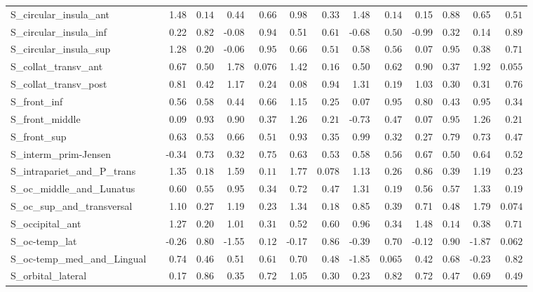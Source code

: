 {\begin{longtable}{llrrrrrrrrrrrr}
S\_circular\_insula\_ant &  & 1.48 & $0.14$ & 0.44 & $0.66$ & 0.98 & $0.33$ & 1.48 & $0.14$ & 0.15 & $0.88$ & 0.65 & $0.51$ \\
S\_circular\_insula\_inf &  & 0.22 & $0.82$ & -0.08 & $0.94$ & 0.51 & $0.61$ & -0.68 & $0.50$ & -0.99 & $0.32$ & 0.14 & $0.89$ \\
S\_circular\_insula\_sup &  & 1.28 & $0.20$ & -0.06 & $0.95$ & 0.66 & $0.51$ & 0.58 & $0.56$ & 0.07 & $0.95$ & 0.38 & $0.71$ \\
S\_collat\_transv\_ant &  & 0.67 & $0.50$ & 1.78 & $0.076$ & 1.42 & $0.16$ & 0.50 & $0.62$ & 0.90 & $0.37$ & 1.92 & $0.055$ \\
S\_collat\_transv\_post &  & 0.81 & $0.42$ & 1.17 & $0.24$ & 0.08 & $0.94$ & 1.31 & $0.19$ & 1.03 & $0.30$ & 0.31 & $0.76$ \\
S\_front\_inf &  & 0.56 & $0.58$ & 0.44 & $0.66$ & 1.15 & $0.25$ & 0.07 & $0.95$ & 0.80 & $0.43$ & 0.95 & $0.34$ \\
S\_front\_middle &  & 0.09 & $0.93$ & 0.90 & $0.37$ & 1.26 & $0.21$ & -0.73 & $0.47$ & 0.07 & $0.95$ & 1.26 & $0.21$ \\
S\_front\_sup &  & 0.63 & $0.53$ & 0.66 & $0.51$ & 0.93 & $0.35$ & 0.99 & $0.32$ & 0.27 & $0.79$ & 0.73 & $0.47$ \\
S\_interm\_prim-Jensen &  & -0.34 & $0.73$ & 0.32 & $0.75$ & 0.63 & $0.53$ & 0.58 & $0.56$ & 0.67 & $0.50$ & 0.64 & $0.52$ \\
S\_intrapariet\_and\_P\_trans &  & 1.35 & $0.18$ & 1.59 & $0.11$ & 1.77 & $0.078$ & 1.13 & $0.26$ & 0.86 & $0.39$ & 1.19 & $0.23$ \\
S\_oc\_middle\_and\_Lunatus &  & 0.60 & $0.55$ & 0.95 & $0.34$ & 0.72 & $0.47$ & 1.31 & $0.19$ & 0.56 & $0.57$ & 1.33 & $0.19$ \\
S\_oc\_sup\_and\_transversal &  & 1.10 & $0.27$ & 1.19 & $0.23$ & 1.34 & $0.18$ & 0.85 & $0.39$ & 0.71 & $0.48$ & 1.79 & $0.074$ \\
S\_occipital\_ant &  & 1.27 & $0.20$ & 1.01 & $0.31$ & 0.52 & $0.60$ & 0.96 & $0.34$ & 1.48 & $0.14$ & 0.38 & $0.71$ \\
S\_oc-temp\_lat &  & -0.26 & $0.80$ & -1.55 & $0.12$ & -0.17 & $0.86$ & -0.39 & $0.70$ & -0.12 & $0.90$ & -1.87 & $0.062$ \\
S\_oc-temp\_med\_and\_Lingual &  & 0.74 & $0.46$ & 0.51 & $0.61$ & 0.70 & $0.48$ & -1.85 & $0.065$ & 0.42 & $0.68$ & -0.23 & $0.82$ \\
S\_orbital\_lateral &  & 0.17 & $0.86$ & 0.35 & $0.72$ & 1.05 & $0.30$ & 0.23 & $0.82$ & 0.72 & $0.47$ & 0.69 & $0.49$ \\

\end{longtable}}
